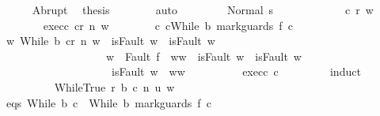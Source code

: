\begin{isabellebody}
\ \ \ \ \isamarkupfalse%
\ Abrupt\ \isamarkupfalse%
\ {\isacharquery}thesis\isanewline
\ \ \ \ \ \ \isamarkupfalse%
\ auto\isanewline
\ \ \isamarkupfalse%
\isanewline
\ \ \ \ \isamarkupfalse%
\ {\isacharparenleft}Normal\ s{\isacharprime}{\isacharparenright}\isanewline
\ \ \ \ \isacommand{{\isacharbraceleft}}\isamarkupfalse%
\isanewline
\ \ \ \ \ \ \isamarkupfalse%
\ c{\isacharprime}\ r\ w\isanewline
\ \ \ \ \ \ \isamarkupfalse%
\ exec{\isacharunderscore}c{\isacharprime}{\isacharcolon}\ {\isachardoublequoteopen}{\isasymGamma}{\isasymturnstile}{\isasymlangle}c{\isacharprime}{\isacharcomma}r{\isasymrangle}\ {\isacharequal}n{\isasymRightarrow}\ w{\isachardoublequoteclose}\isanewline
\ \ \ \ \ \ \isamarkupfalse%
\ c{\isacharprime}{\isacharcolon}\ {\isachardoublequoteopen}c{\isacharprime}{\isacharequal}While\ b\ {\isacharparenleft}mark{\isacharunderscore}guards\ f\ c{\isacharparenright}{\isachardoublequoteclose}\isanewline
\ \ \ \ \ \ \isamarkupfalse%
\ {\isachardoublequoteopen}{\isasymexists}w{\isacharprime}{\isachardot}\ {\isasymGamma}{\isasymturnstile}{\isasymlangle}While\ b\ c{\isacharcomma}r{\isasymrangle}\ {\isacharequal}n{\isasymRightarrow}\ w{\isacharprime}\ {\isasymand}\ {\isacharparenleft}isFault\ w\ {\isasymlongrightarrow}\ isFault\ w{\isacharprime}{\isacharparenright}\ {\isasymand}\isanewline
\ \ \ \ \ \ \ \ \ \ \ \ \ \ \ \ \ \ \ {\isacharparenleft}w{\isacharprime}\ {\isacharequal}\ Fault\ f\ {\isasymlongrightarrow}\ w{\isacharprime}{\isacharequal}w{\isacharparenright}\ {\isasymand}\ {\isacharparenleft}isFault\ w{\isacharprime}\ {\isasymlongrightarrow}\ isFault\ w{\isacharparenright}\ {\isasymand}\isanewline
\ \ \ \ \ \ \ \ \ \ \ \ \ \ \ \ \ \ \ {\isacharparenleft}{\isasymnot}\ isFault\ w{\isacharprime}\ {\isasymlongrightarrow}\ w{\isacharprime}{\isacharequal}w{\isacharparenright}{\isachardoublequoteclose}\isanewline
\ \ \ \ \ \ \ \ \isamarkupfalse%
\ exec{\isacharunderscore}c{\isacharprime}\ c{\isacharprime}\ \isanewline
\ \ \ \ \ \ \isamarkupfalse%
\ {\isacharparenleft}induct{\isacharparenright}\isanewline
\ \ \ \ \ \ \ \ \isamarkupfalse%
\ {\isacharparenleft}WhileTrue\ r\ b{\isacharprime}\ c{\isacharprime}{\isacharprime}\ n\ u\ w{\isacharparenright}\isanewline
\ \ \ \ \ \ \ \ \isamarkupfalse%
\ eqs{\isacharcolon}\ {\isachardoublequoteopen}While\ b{\isacharprime}\ c{\isacharprime}{\isacharprime}\ {\isacharequal}\ While\ b\ {\isacharparenleft}mark{\isacharunderscore}guards\ f\ c{\isacharparenright}{\isachardoublequoteclose}\ \isamarkupfalse%

\end{isabellebody}
